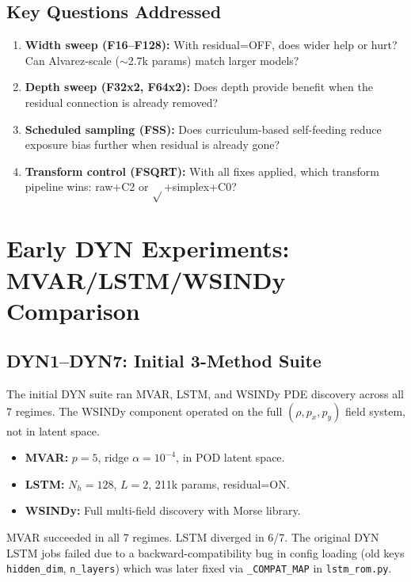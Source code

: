 \documentclass[11pt]{article}
\begin{document}
\subsection{Key Questions Addressed}

\begin{enumerate}[nosep]
  \item \textbf{Width sweep (F16--F128):} With residual=OFF, does wider help or hurt?
    Can Alvarez-scale ($\sim$2.7k params) match larger models?
  \item \textbf{Depth sweep (F32x2, F64x2):} Does depth provide benefit when the
    residual connection is already removed?
  \item \textbf{Scheduled sampling (FSS):} Does curriculum-based self-feeding reduce
    exposure bias further when residual is already gone?
  \item \textbf{Transform control (FSQRT):} With all fixes applied, which transform
    pipeline wins: raw+C2 or $\sqrt{}$+simplex+C0?
\end{enumerate}


\section{Early DYN Experiments: MVAR/LSTM/WSINDy Comparison}
\label{sec:dyn}

\subsection{DYN1--DYN7: Initial 3-Method Suite}

The initial DYN suite ran MVAR, LSTM, and WSINDy PDE discovery across
all 7 regimes.  The WSINDy component operated on the full
$(\rho, p_x, p_y)$ field system, not in latent space.

\begin{itemize}[nosep]
  \item \textbf{MVAR:} $p=5$, ridge $\alpha=10^{-4}$, in POD latent space.
  \item \textbf{LSTM:} $N_h=128$, $L=2$, 211k params, residual=ON.
  \item \textbf{WSINDy:} Full multi-field discovery with Morse library.
\end{itemize}

MVAR succeeded in all 7 regimes.  LSTM diverged in 6/7.
The original DYN LSTM jobs failed due to a backward-compatibility
bug in config loading (old keys \texttt{hidden\_dim}, \texttt{n\_layers})
which was later fixed via \texttt{\_COMPAT\_MAP} in \texttt{lstm\_rom.py}.
\end{document}
